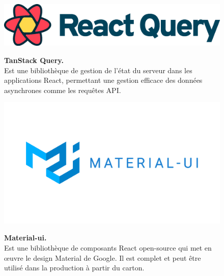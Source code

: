 \begin{figure}[H]
    \centering
    \begin{minipage}[c]{0.3\textwidth}
        \includegraphics[width=\linewidth]{projet/images/diagramme de sequance/images/TanStack Query.png}
    \end{minipage}
    \hspace{1cm}
    \begin{minipage}[c]{0.6\textwidth}
        \textbf{TanStack Query.}\\[0.5em]
    Est une bibliothèque de gestion de l'état du serveur dans les applications React, permettant une gestion efficace des données asynchrones comme les requêtes API. \cite{ref20}
    \end{minipage}
\end{figure}
\vspace{0.5cm}

\begin{figure}[H]
    \centering
    \begin{minipage}[c]{0.3\textwidth}
        \includegraphics[width=\linewidth]{projet/images/diagramme de sequance/images/material-ui-.png}
    \end{minipage}
    \hspace{1cm}
    \begin{minipage}[c]{0.6\textwidth}
        \textbf{Material-ui.}\\[0.5em]
    Est une bibliothèque de composants React open-source qui met en
œuvre le design Material de Google. Il est complet et peut être utilisé dans la production à partir du carton. \cite{ref21}
    \end{minipage}
\end{figure}
\vspace{0.5cm}

